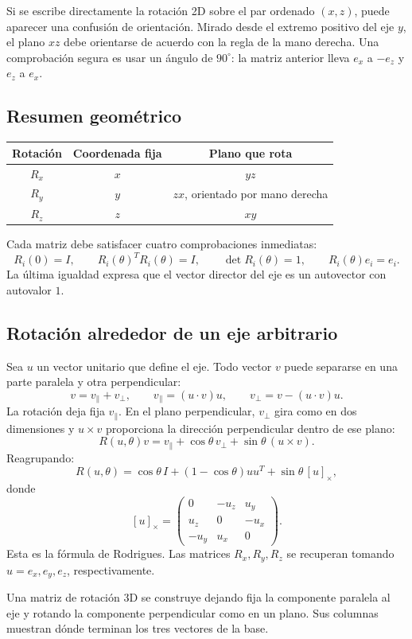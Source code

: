 \begin{atencion}
Si se escribe directamente la rotación 2D sobre el par ordenado \((x,z)\), puede aparecer
una confusión de orientación. Mirado desde el extremo positivo del eje \(y\), el plano
\(xz\) debe orientarse de acuerdo con la regla de la mano derecha. Una comprobación segura es
usar un ángulo de \(90^\circ\): la matriz anterior lleva \(e_x\) a \(-e_z\) y \(e_z\) a
\(e_x\).
\end{atencion}

\subsection{Resumen geométrico}

\begin{center}
\begin{tabularx}{.9\textwidth}{>{\bfseries}c c c}
\toprule
Rotación & Coordenada fija & Plano que rota\\
\midrule
\(R_x\) & \(x\) & \(yz\)\\
\(R_y\) & \(y\) & \(zx\), orientado por mano derecha\\
\(R_z\) & \(z\) & \(xy\)\\
\bottomrule
\end{tabularx}
\end{center}

Cada matriz debe satisfacer cuatro comprobaciones inmediatas:
\[
R_i(0)=I,\qquad
R_i(\theta)^TR_i(\theta)=I,\qquad
\det R_i(\theta)=1,\qquad
R_i(\theta)e_i=e_i.
\]
La última igualdad expresa que el vector director del eje es un autovector con autovalor
\(1\).

\subsection{Rotación alrededor de un eje arbitrario}

Sea \(u\) un vector unitario que define el eje. Todo vector \(v\) puede separarse en una parte
paralela y otra perpendicular:
\[
v=v_\parallel+v_\perp,
\qquad
v_\parallel=(u\cdot v)u,
\qquad
v_\perp=v-(u\cdot v)u.
\]
La rotación deja fija \(v_\parallel\). En el plano perpendicular, \(v_\perp\) gira como en
dos dimensiones y \(u\times v\) proporciona la dirección perpendicular dentro de ese plano:
\[
R(u,\theta)v
=
v_\parallel
+\cos\theta\,v_\perp
+\sin\theta\,(u\times v).
\]
Reagrupando:
\[
\boxed{
R(u,\theta)
=
\cos\theta\,I
+(1-\cos\theta)uu^T
+\sin\theta\,[u]_\times
},
\]
donde
\[
[u]_\times=
\begin{pmatrix}
0&-u_z&u_y\\
u_z&0&-u_x\\
-u_y&u_x&0
\end{pmatrix}.
\]
Esta es la fórmula de Rodrigues. Las matrices \(R_x,R_y,R_z\) se recuperan tomando
\(u=e_x,e_y,e_z\), respectivamente.

\begin{resultado}
Una matriz de rotación 3D se construye dejando fija la componente paralela al eje y rotando
la componente perpendicular como en un plano. Sus columnas muestran dónde terminan los tres
vectores de la base.
\end{resultado}

